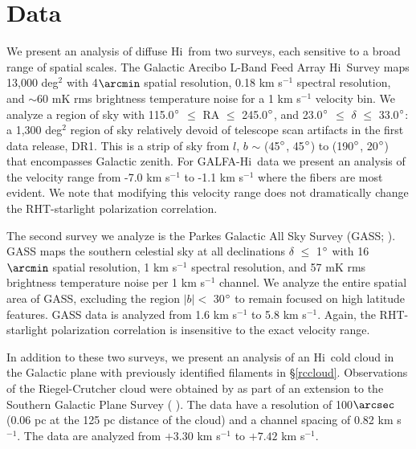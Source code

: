 \documentclass[12pt]{emulateapj}
\newcommand{\hi}{H{\sc i}~}
\newcommand{\hia}{H{\sc i}}
\newcommand{\citei}[1]{\citeauthor{#1} \citeyear{#1}}
\begin{document}
\section{Data}\label{data}
We present an analysis of diffuse \hi from two surveys, each sensitive to a broad range of spatial scales. The Galactic Arecibo L-Band Feed Array \hi Survey \citep[GALFA-\hia;][]{2011ApJS..194...20P} maps 13,000 deg${^2}$ with 4${\arcmin}$ spatial resolution, 0.18 km s${^{-1}}$ spectral resolution, and ${\sim}$60 mK rms brightness temperature noise for a 1 km s$^{-1}$ velocity bin. We analyze a region of sky with 115.0${\degree}$ ${\le}$ RA ${\le}$ 245.0${\degree}$, and 23.0${\degree}$ ${\le}$ ${\delta}$ ${\le}$ 33.0${\degree}$: a 1,300 deg${^2}$ region of sky relatively devoid of telescope scan artifacts in the first data release, DR1. This is a strip of sky from $l$, $b$ $\sim$ (45$\degree$, 45$\degree$) to (190$\degree$, 20$\degree$) that encompasses Galactic zenith. 
For GALFA-\hi data we present an analysis of the velocity range from -7.0 km s$^{-1}$ to -1.1 km s$^{-1}$ where the fibers are most evident. We note that modifying this velocity range does not dramatically change the RHT-starlight polarization correlation. 

The second survey we analyze is the Parkes Galactic All Sky Survey (GASS; \citei{McClureGriffiths:2009dn}).  GASS maps the southern celestial sky at all declinations ${\delta}$ ${\le}$ 1${\degree}$ with 16${\arcmin}$ spatial resolution, 1 km s${^{-1}}$ spectral resolution, and 57 mK rms brightness temperature noise per 1 km s${^{-1}}$ channel.  We analyze the entire spatial area of GASS, excluding the region ${\left| b \right| <}$ 30${\degree}$ to remain focused on high latitude features.  GASS data is analyzed from 1.6 km s$^{-1}$ to 5.8 km s$^{-1}$. Again, the RHT-starlight polarization correlation is insensitive to the exact velocity range. 

In addition to these two surveys, we present an analysis of an \hi cold cloud in the Galactic plane with previously identified filaments in \S \ref{rccloud}. Observations of the Riegel-Crutcher cloud were obtained by \cite[][hereafter McC-G06]{McClureGriffiths:2006wx} as part of an extension to the Southern Galactic Plane Survey (\citei{McClureGriffiths:2005dv}). The data have a resolution of 100${\arcsec}$ (0.06 pc at the 125 pc distance of the cloud) and a channel spacing of 0.82 km s$^{-1}$. The data are analyzed from $+3.30$ km s$^{-1}$ to $+7.42$ km s$^{-1}$. 
\end{document}

